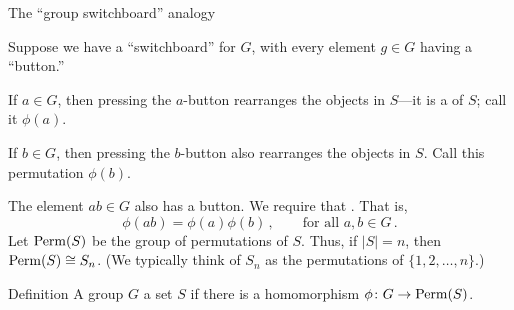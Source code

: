 \documentclass[8pt,handout]{beamer}
\newcommand{\Pause}{}      %
\begin{document}

\begin{frame}{The ``group switchboard'' analogy} %

  Suppose we have a ``switchboard'' for $G$, with every element $g\in
  G$ having a ``button.''

  \bigskip\Pause 

  If $a\in G$, then pressing the $a$-button rearranges the
  objects in $S$---it is a 
  of $S$; call it $\phi(a)$.

  \bigskip\Pause 

  If $b\in G$, then pressing the $b$-button also rearranges the objects in
  $S$. Call this permutation $\phi(b)$.

  \bigskip\Pause 

  The element $ab\in G$ also has a button. We require that
  . \Pause That
  is,
  \[
  \phi(ab)=\phi(a)\phi(b)\,,\qquad\text{for all } a,b\in G\,.
  \]
  \Pause Let $\operatorname{Perm}(S)$ be the group of permutations of $S$. Thus, if
  $|S|=n$, then $\operatorname{Perm}(S)\cong S_n$. (We typically think of
  $S_n$ as the permutations of $\{1,2,\dots,n\}$.)
  
  \medskip\Pause 
  
  \begin{block}{Definition}
    A group $G$  a set $S$ if there is a homomorphism
    $\phi\colon G\to\operatorname{Perm}(S)$.
  \end{block}

\end{frame}

\end{document}
